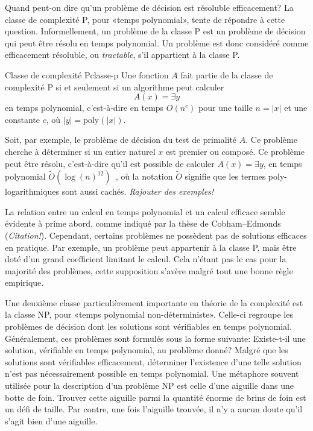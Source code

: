 Quand peut-on dire qu'un problème de décision est résoluble efficacement? La classe de complexité \textsf{P}, pour «temps polynomial», tente de répondre à cette question. Informellement, un problème de la classe \textsf{P} est un problème de décision qui peut être résolu en temps polynomial. Un problème est donc considéré comme efficacement résoluble, ou \textit{tractable}, s'il appartient à la classe \textsf{P}. 

\begin{maindefinition}{Classe de complexité \textsf{P}}{classe-p}
    Une fonction $A$ fait partie de la classe de complexité \textsf{P} si et seulement si un algorithme peut calculer 
    \begin{equation*}
        A(x)=\exists y
    \end{equation*}
    en temps polynomial, c’est-à-dire en temps $O(n^{c})$ pour une taille $n = \lvert x \rvert$ et une constante $c$, où $\lvert y \rvert = \mathrm{poly}(\lvert x \rvert )$.
\end{maindefinition}

Soit, par exemple, le problème de décision du test de primalité $A$. Ce problème cherche à déterminer si un entier naturel $x$ est premier ou composé. Ce problème peut être résolu, c'est-à-dire qu'il est possible de calculer $A(x)=\exists y$, en temps polynomial $\tilde{O}(\log(n)^{12})$~\cite{PRIMESAnnalsMathematics}, où la notation $\tilde{O}$ signifie que les termes poly-logarithmiques sont aussi cachés. \textcolor{mydarkred}{\textit{Rajouter des exemples!}}

La relation entre un calcul en temps polynomial et un calcul efficace semble évidente à prime abord, comme indiqué par la thèse de Cobham–Edmonds (\textcolor{mydarkred}{\textit{Citation!}}). Cependant, certains problèmes ne possèdent pas de solutions efficaces en pratique. Par exemple, un problème peut appartenir à la classe \textsf{P}, mais être doté d'un grand coefficient limitant le calcul. Cela n'étant pas le cas pour la majorité des problèmes, cette supposition s'avère malgré tout une bonne règle empirique.

Une deuxième classe particulièrement importante en théorie de la complexité est la classe \textsf{NP}, pour «temps polynomial non-déterministe». Celle-ci regroupe les problèmes de décision dont les solutions sont vérifiables en temps polynomial. Généralement, ces problèmes sont formulés sous la forme suivante: Existe-t-il une solution, vérifiable en temps polynomial, au problème donné? Malgré que les solutions sont vérifiables efficacement, déterminer l'existence d'une telle solution n'est pas nécessairement possible en temps polynomial. Une métaphore souvent utilisée pour la description d'un problème \textsf{NP} est celle d'une aiguille dans une botte de foin. Trouver cette aiguille parmi la quantité énorme de brins de foin est un défi de taille. Par contre, une fois l'aiguille trouvée, il n'y a aucun doute qu'il s'agit bien d'une aiguille. 

